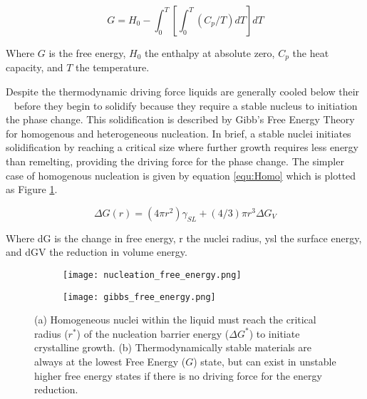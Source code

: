 \documentclass[a4paper,12pt,oneside]{report}%
\begin{document}
\begin{equation}
	G = H_{0}-\int_{0}^{T} 
	\left[
	\int_{0}^{T}(C_{p}/T) dT
	\right] dT
	\label{equ:Gibbs}
\end{equation}

Where $G$ is the free energy, $H_{0}$ the enthalpy at absolute zero, $C_{p}$ the heat capacity, and $T$ the temperature. 

Despite the thermodynamic driving force liquids are generally cooled below their \Tm~ before they begin to solidify because they require a stable nucleus to initiation the phase change. This solidification is described by Gibb's Free Energy Theory for homogenous and heterogeneous nucleation. In brief, a stable nuclei initiates solidification by reaching a critical size where further growth requires less energy than remelting, providing the driving force for the phase change. The simpler case of homogenous nucleation is given by equation \ref{equ:Homo} which is plotted as Figure \ref{fig:GibbsNucleation}. 

\begin{equation}
\Delta G(r) = (4 \pi r^2 ) \gamma_{SL}+(4/3) \pi r^3 \Delta G_{V} 
\label{equ:Homo}
\end{equation}

Where \acrshort{dG} is the change in free energy, \acrshort{r} the nuclei radius, \acrshort{ysl} the surface energy, and \acrshort{dGV} the reduction in volume energy.

\begin{figure}[h]
	\centering
	\begin{subfigure}[htbp]{0.49\textwidth}
		\texttt{[image: nucleation\_free\_energy.png]}
		\caption{}
		\label{fig:GibbsNucleation}
	\end{subfigure}
	\begin{subfigure}[htbp]{0.49\textwidth}
		\texttt{[image: gibbs\_free\_energy.png]}
		\caption{}
		\label{fig:FreeEnergy}
	\end{subfigure}
	\caption{(a) Homogeneous nuclei within the liquid must reach the critical radius ($r^*$) of the nucleation barrier energy ($\Delta G^*$) to initiate crystalline growth. (b) Thermodynamically stable materials are always at the lowest Free Energy ($G$) state, but can exist in unstable higher free energy states if there is no driving force for the energy reduction.}%
	\label{fig:Gibbs}
\end{figure}
\end{document}
